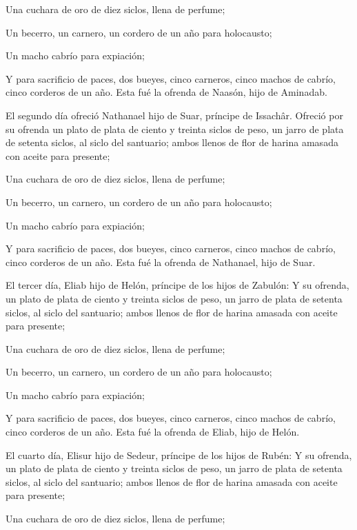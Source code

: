  Una cuchara de oro de diez siclos, llena de perfume;

 Un becerro, un carnero, un cordero de un año para
holocausto;

 Un macho cabrío para expiación;

 Y para sacrificio de paces, dos bueyes, cinco carneros,
cinco machos de cabrío, cinco corderos de un año. Esta fué la ofrenda de
Naasón, hijo de Aminadab.

 El segundo día ofreció Nathanael hijo de Suar, príncipe de
Issachâr.  Ofreció por su ofrenda un plato de plata de
ciento y treinta siclos de peso, un jarro de plata de setenta siclos, al
siclo del santuario; ambos llenos de flor de harina amasada con aceite
para presente;

 Una cuchara de oro de diez siclos, llena de perfume;

 Un becerro, un carnero, un cordero de un año para
holocausto;

 Un macho cabrío para expiación;

 Y para sacrificio de paces, dos bueyes, cinco carneros,
cinco machos de cabrío, cinco corderos de un año. Esta fué la ofrenda de
Nathanael, hijo de Suar.

 El tercer día, Eliab hijo de Helón, príncipe de los hijos
de Zabulón:  Y su ofrenda, un plato de plata de ciento y
treinta siclos de peso, un jarro de plata de setenta siclos, al siclo
del santuario; ambos llenos de flor de harina amasada con aceite para
presente;

 Una cuchara de oro de diez siclos, llena de perfume;

 Un becerro, un carnero, un cordero de un año para
holocausto;

 Un macho cabrío para expiación;

 Y para sacrificio de paces, dos bueyes, cinco carneros,
cinco machos de cabrío, cinco corderos de un año. Esta fué la ofrenda de
Eliab, hijo de Helón.

 El cuarto día, Elisur hijo de Sedeur, príncipe de los
hijos de Rubén:  Y su ofrenda, un plato de plata de ciento
y treinta siclos de peso, un jarro de plata de setenta siclos, al siclo
del santuario; ambos llenos de flor de harina amasada con aceite para
presente;

 Una cuchara de oro de diez siclos, llena de perfume;

